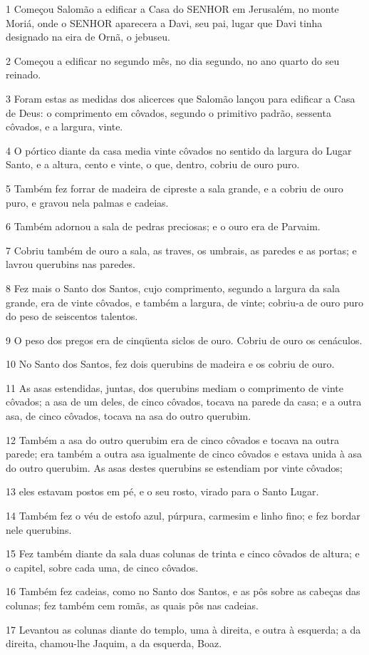 \par 1 Começou Salomão a edificar a Casa do SENHOR em Jerusalém, no monte Moriá, onde o SENHOR aparecera a Davi, seu pai, lugar que Davi tinha designado na eira de Ornã, o jebuseu.
\par 2 Começou a edificar no segundo mês, no dia segundo, no ano quarto do seu reinado.
\par 3 Foram estas as medidas dos alicerces que Salomão lançou para edificar a Casa de Deus: o comprimento em côvados, segundo o primitivo padrão, sessenta côvados, e a largura, vinte.
\par 4 O pórtico diante da casa media vinte côvados no sentido da largura do Lugar Santo, e a altura, cento e vinte, o que, dentro, cobriu de ouro puro.
\par 5 Também fez forrar de madeira de cipreste a sala grande, e a cobriu de ouro puro, e gravou nela palmas e cadeias.
\par 6 Também adornou a sala de pedras preciosas; e o ouro era de Parvaim.
\par 7 Cobriu também de ouro a sala, as traves, os umbrais, as paredes e as portas; e lavrou querubins nas paredes.
\par 8 Fez mais o Santo dos Santos, cujo comprimento, segundo a largura da sala grande, era de vinte côvados, e também a largura, de vinte; cobriu-a de ouro puro do peso de seiscentos talentos.
\par 9 O peso dos pregos era de cinqüenta siclos de ouro. Cobriu de ouro os cenáculos.
\par 10 No Santo dos Santos, fez dois querubins de madeira e os cobriu de ouro.
\par 11 As asas estendidas, juntas, dos querubins mediam o comprimento de vinte côvados; a asa de um deles, de cinco côvados, tocava na parede da casa; e a outra asa, de cinco côvados, tocava na asa do outro querubim.
\par 12 Também a asa do outro querubim era de cinco côvados e tocava na outra parede; era também a outra asa igualmente de cinco côvados e estava unida à asa do outro querubim. As asas destes querubins se estendiam por vinte côvados;
\par 13 eles estavam postos em pé, e o seu rosto, virado para o Santo Lugar.
\par 14 Também fez o véu de estofo azul, púrpura, carmesim e linho fino; e fez bordar nele querubins.
\par 15 Fez também diante da sala duas colunas de trinta e cinco côvados de altura; e o capitel, sobre cada uma, de cinco côvados.
\par 16 Também fez cadeias, como no Santo dos Santos, e as pôs sobre as cabeças das colunas; fez também cem romãs, as quais pôs nas cadeias.
\par 17 Levantou as colunas diante do templo, uma à direita, e outra à esquerda; a da direita, chamou-lhe Jaquim, a da esquerda, Boaz.

